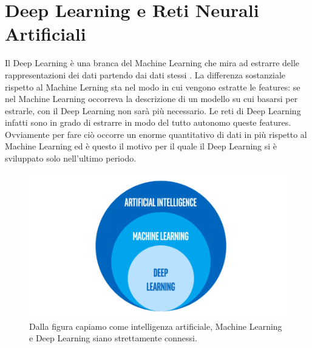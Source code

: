 \section{Deep Learning e Reti Neurali Artificiali}
Il Deep Learning è una branca del Machine Learning che mira ad estrarre delle rappresentazioni dei dati partendo dai dati stessi \cite{lecun2015deep}. La differenza sostanziale rispetto al Machine Lerning sta nel modo in cui vengono estratte le features: se nel Machine Learning occorreva la descrizione di un modello su cui basarsi per estrarle, con il Deep Learning non sarà più necessario. Le reti di Deep Learning infatti sono in grado di estrarre in modo del tutto autonomo queste features. Ovviamente per fare ciò occorre un enorme quantitativo di dati in più rispetto al Machine Learning ed è questo il motivo per il quale il Deep Learning si è sviluppato solo nell'ultimo periodo.

\begin{figure}[H]
  \begin{center}
    \includegraphics[width=0.8\columnwidth]{images/ai-machine-learning-deep-learning-rwd.png.rendition.intel.web.480.270.png}
  \end{center}
  \caption{Dalla figura capiamo come intelligenza artificiale, Machine Learning e Deep Learning siano strettamente connessi.}
  \label{fig:Artificial Intelligence Diagram}
\end{figure}

